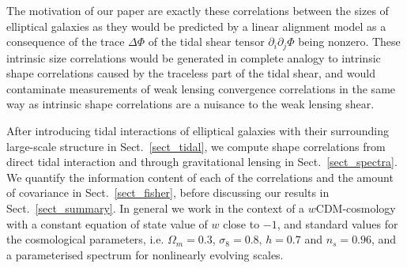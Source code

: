 \documentclass[a4paper,fleqn,usenatbib]{mnras}
\begin{document}
The motivation of our paper are exactly these correlations between the sizes of elliptical galaxies as they would be predicted by a linear alignment model as a consequence of the trace $\Delta\Phi$ of the tidal shear tensor $\partial_i\partial_j\Phi$ being nonzero. These intrinsic size correlations would be generated in complete analogy to intrinsic shape correlations caused by the traceless part of the tidal shear, and would contaminate measurements of weak lensing convergence correlations in the same way as intrinsic shape correlations are a nuisance to the weak lensing shear.

After introducing tidal interactions of elliptical galaxies with their surrounding large-scale structure in Sect.~\ref{sect_tidal}, we compute shape correlations from direct tidal interaction and through gravitational lensing in Sect.~\ref{sect_spectra}. We quantify the information content of each of the correlations and the amount of covariance in Sect.~\ref{sect_fisher}, before discussing our results in Sect.~\ref{sect_summary}. In general we work in the context of a $w$CDM-cosmology with a constant equation of state value of $w$ close to $-1$, and standard values for the cosmological parameters, i.e. $\Omega_m = 0.3$, $\sigma_8 =  0.8$, $h = 0.7$ and $n_s = 0.96$, and a parameterised spectrum for nonlinearly evolving scales.


\end{document}
